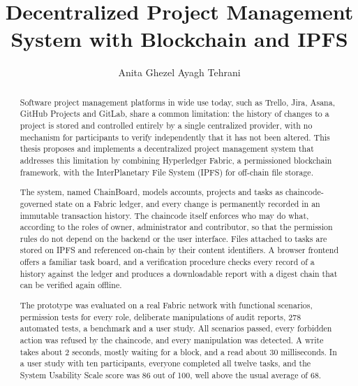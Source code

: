 \documentclass{masterthesis}
\begin{document}
\title{Decentralized Project Management System with Blockchain and IPFS}

\author{Anita Ghezel Ayagh Tehrani}




\maketitle

\begin{abstract}
Software project management platforms in wide use today, such as Trello, Jira, Asana, GitHub Projects and GitLab, share a common limitation: the history of changes to a project is stored and controlled entirely by a single centralized provider, with no mechanism for participants to verify independently that it has not been altered. This thesis proposes and implements a decentralized project management system that addresses this limitation by combining Hyperledger Fabric, a permissioned blockchain framework, with the InterPlanetary File System (IPFS) for off-chain file storage.

The system, named ChainBoard, models accounts, projects and tasks as chaincode-governed state on a Fabric ledger, and every change is permanently recorded in an immutable transaction history. The chaincode itself enforces who may do what, according to the roles of owner, administrator and contributor, so that the permission rules do not depend on the backend or the user interface. Files attached to tasks are stored on IPFS and referenced on-chain by their content identifiers. A browser frontend offers a familiar task board, and a verification procedure checks every record of a history against the ledger and produces a downloadable report with a digest chain that can be verified again offline.

The prototype was evaluated on a real Fabric network with functional scenarios, permission tests for every role, deliberate manipulations of audit reports, 278 automated tests, a benchmark and a user study. All scenarios passed, every forbidden action was refused by the chaincode, and every manipulation was detected. A write takes about 2 seconds, mostly waiting for a block, and a read about 30 milliseconds. In a user study with ten participants, everyone completed all twelve tasks, and the System Usability Scale score was 86 out of 100, well above the usual average of 68.
\end{abstract}
\end{document}
